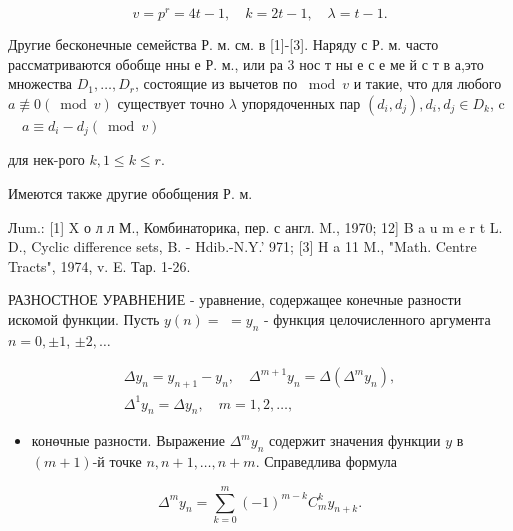 \documentclass[10pt]{article}
\begin{document}
\[

v=p^{r}=4 t-1, \quad k=2 t-1, \quad \lambda=t-1 .

\]



Другие бесконечные семейства Р. м. см. в [1]-[3]. Наряду с Р. м. часто рассматриваются обобще нны е Р. м., или ра 3 нос т ны е с е ме й с т в а,это множества $D_{1}, \ldots, D_{r}$, состоящие из вычетов по $\bmod v$ и такие, что для любого $a \not \equiv 0(\bmod v)$ существует точно $\lambda$ упорядоченных пар $\left(d_{i}, d_{j}\right), d_{i}, d_{j} \in D_{k}$, c $\quad a \equiv d_{i}-d_{j}(\bmod v)$



для нек-рого $k, 1 \leqslant k \leqslant r$.



Имеются также другие обобщения Р. м.



Лum.: [1] X о л л М., Комбинаторика, пер. с англ. M., 1970; 12] B a u m e r t L. D., Cyclic difference sets, B. - Hdib.-N.Y.' 971; [3] H a 11 M., "Math. Centre Tracts", 1974, v. E. Тар. 1-26.



РАЗНОСТНОЕ УРАВНЕНИЕ - уравнение, содержащее конечные разности искомой функции. Пусть $y(n)=$ $=y_{n}$ - функция целочисленного аргумента $n=0, \pm 1$, $\pm 2, \ldots$



\[

\begin{gathered}

\Delta y_{n}=y_{n+1}-y_{n}, \quad \Delta^{m+1} y_{n}=\Delta\left(\Delta^{m} y_{n}\right), \\

\Delta^{1} y_{n}=\Delta y_{n}, \quad m=1,2, \ldots,

\end{gathered}

\]



\begin{itemize}

  \item конөчные разности. Выражение $\Delta^{m} y_{n}$ содержит значения функции $y$ в $(m+1)$-й точке $n, n+1, \ldots, n+m$. Справедлива формула

\end{itemize}



\[

\Delta^{m} y_{n}=\sum_{k=0}^{m}(-1)^{m-k} C_{m}^{k} y_{n+k} .

\]
\end{document}
